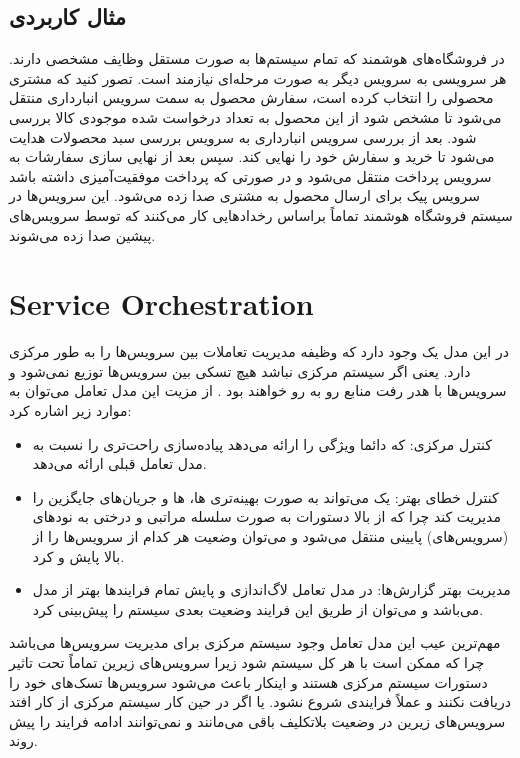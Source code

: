 \documentclass[a4paper]{article}
\begin{document}
\subsection*{مثال کاربردی}

در فروشگاه‌های هوشمند که تمام سیستم‌ها به صورت مستقل وظایف مشخصی دارند. هر
سرویسی به سرویس دیگر به صورت مرحله‌ای نیازمند است. تصور کنید که مشتری محصولی را
انتخاب کرده است، سفارش محصول به سمت سرویس انبارداری منتقل می‌شود تا مشخص شود از
این محصول به تعداد درخواست شده موجودی کالا بررسی شود. بعد از بررسی سرویس
انبارداری به سرویس بررسی سبد محصولات هدایت می‌شود تا خرید و سفارش خود را نهایی
کند. سپس بعد از نهایی سازی سفارشات به سرویس پرداخت منتقل می‌شود و در صورتی که
پرداخت موفقیت‌آمیزی داشته باشد سرویس پیک برای ارسال محصول به مشتری صدا زده
می‌شود. این سرویس‌ها در سیستم فروشگاه هوشمند تماماً براساس رخدادهایی کار می‌کنند
که توسط سرویس‌های پیشین صدا زده می‌شوند.

\section{Service Orchestration}

در این مدل یک  وجود دارد که وظیفه مدیریت تعاملات بین
سرویس‌ها را به طور مرکزی دارد. یعنی اگر سیستم مرکزی نباشد هیچ تسکی بین سرویس‌ها
توزیع نمی‌شود و سرویس‌ها با هدر رفت منابع رو به رو خواهند بود \cite{cvom}. از
مزیت این مدل تعامل می‌توان به موارد زیر اشاره کرد:

\begin{itemize}
    \item کنترل مرکزی: که دائما ویژگی  را ارائه
    می‌دهد پیاده‌سازی راحت‌تری را نسبت به مدل تعامل قبلی ارائه می‌دهد.
    \item کنترل خطای بهتر: یک  می‌تواند به صورت بهینه‌تری
    ها، ها و جریان‌های جایگزین را مدیریت کند چرا که از
    بالا دستورات به صورت سلسله مراتبی و درختی به نود‌های (سرویس‌های) پایینی
    منتقل می‌شود و می‌توان وضعیت هر کدام از سرویس‌ها را از بالا پایش و
     کرد.
    \item مدیریت بهتر گزارش‌ها: در مدل تعامل  لاگ‌اندازی و
    پایش تمام فرایند‌ها بهتر از مدل  می‌باشد و می‌توان از طریق
    این فرایند وضعیت بعدی سیستم را پیش‌بینی کرد.
\end{itemize}

مهم‌ترین عیب این مدل تعامل وجود سیستم مرکزی برای مدیریت سرویس‌ها می‌باشد چرا که
ممکن است با هر  کل سیستم  شود زیرا
سرویس‌های زیرین تماماً تحت تاثیر دستورات سیستم مرکزی هستند و اینکار باعث می‌شود
سرویس‌ها تسک‌های خود را دریافت نکنند و عملاً فرایندی شروع نشود. یا اگر در حین
کار سیستم مرکزی از کار افتد سرویس‌های زیرین در وضعیت بلاتکلیف باقی می‌مانند و
نمی‌توانند ادامه فرایند را پیش روند.
\end{document}
